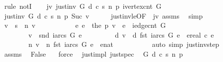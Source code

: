 \begin{isabellebody}
%
\isadelimproof
%
\endisadelimproof
%
\isatagproof
{}\isamarkupfalse%
\ {\isacharparenleft}rule\ notI{\isacharparenright}\isanewline
\ \ \isamarkupfalse%
\ jv{\isacharcolon}\ {\isachardoublequoteopen}just{\isacharunderscore}inv\ G\ d\ c\ s\ n\ p\ {\isacharparenleft}ivertex{\isacharunderscore}cnt\ G{\isacharparenright}{\isachardoublequoteclose}\isanewline
\ \ \isamarkupfalse%
\ {\isachardoublequoteopen}just{\isacharunderscore}inv\ G\ d\ c\ s\ n\ p\ {\isacharparenleft}Suc\ v{\isacharparenright}{\isachardoublequoteclose}\isanewline
\ \ \ \ \isamarkupfalse%
\ just{\isacharunderscore}inv{\isacharunderscore}le{\isacharbrackleft}OF\ {\isacharunderscore}\ jv{\isacharbrackright}\ assms{\isacharparenleft}{}{\isacharparenright}\ \isamarkupfalse%
\ simp\isanewline
\ \ \isamarkupfalse%
\ \isamarkupfalse%
\ {\isachardoublequoteopen}{\isacharparenleft}v\ {\isasymnoteq}\ s\ {\isasymand}\ n\ v\ {\isasymnoteq}\ {\isasyminfinity}\ {\isasymlongrightarrow}\ \isanewline
\ \ \ \ \ \ {\isacharparenleft}{\isasymexists}\ e{\isachardot}\ e\ {\isacharequal}\ the\ {\isacharparenleft}p\ v{\isacharparenright}\ {\isasymand}\ e\ {\isacharless}\ iedge{\isacharunderscore}cnt\ G\ {\isasymand}\ \isanewline
\ \ \ \ \ \ \ \ v\ {\isacharequal}\ snd\ {\isacharparenleft}iarcs\ G\ e{\isacharparenright}\ {\isasymand}\isanewline
\ \ \ \ \ \ \ \ d\ v\ {\isacharequal}\ d\ {\isacharparenleft}fst\ {\isacharparenleft}iarcs\ G\ e{\isacharparenright}{\isacharparenright}\ {\isacharplus}\ ereal\ {\isacharparenleft}c\ e{\isacharparenright}\ {\isasymand}\isanewline
\ \ \ \ \ \ \ \ n\ v\ {\isacharequal}\ n\ {\isacharparenleft}fst\ {\isacharparenleft}iarcs\ G\ e{\isacharparenright}{\isacharparenright}\ {\isacharplus}\ {\isacharparenleft}enat\ {}{\isacharparenright}{\isacharparenright}{\isacharparenright}{\isachardoublequoteclose}\isanewline
\ \ \ \ \ \ \ \ \isamarkupfalse%
\ {\isacharparenleft}auto\ simp{\isacharcolon}\ just{\isacharunderscore}inv{\isacharunderscore}step{\isacharparenright}\isanewline
\ \ \isamarkupfalse%
\ assms\ \isamarkupfalse%
\ False\ \ \isamarkupfalse%
\ force\isanewline
{}\isamarkupfalse%
%
\endisatagproof
{\isafoldproof}%
%
\isadelimproof
\isanewline
%
\endisadelimproof
\isanewline
{}\isamarkupfalse%
\ {\isacharparenleft}\ just{\isacharunderscore}impl{\isacharparenright}\ just{\isacharunderscore}spec{\isacharcolon}\isanewline
\ \ {\isachardoublequoteopen}{\isasymforall}G\ d\ c\ s\ n\ p{\isachardot}\ \isanewline

\end{isabellebody}
